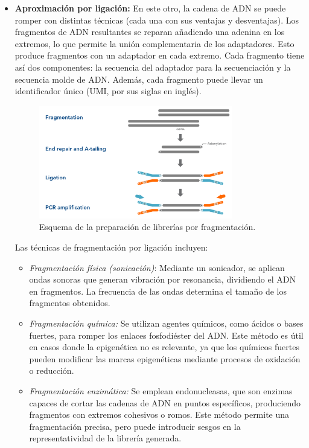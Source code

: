 \begin{itemize}
\item \textbf{Aproximación por ligación:} 
En este otro, la cadena de ADN se puede romper con distintas técnicas (cada una con sus ventajas y desventajas). Los fragmentos de ADN resultantes se reparan añadiendo una adenina en los extremos, lo que permite la unión complementaria de los adaptadores. Esto produce fragmentos con un adaptador en cada extremo. Cada fragmento tiene así dos componentes: la secuencia del adaptador para la secuenciación y la secuencia molde de ADN. Además, cada fragmento puede llevar un identificador único (UMI, por sus siglas en inglés). 

\begin{figure}[htbp]
\centering
\includegraphics[width = 0.8\textwidth]{figs/19_ng_lib-prep-frag.png}
\caption{Esquema de la preparación de librerías por fragmentación.}
\end{figure}

Las técnicas de fragmentación por ligación incluyen:
\begin{itemize}
\item \textit{Fragmentación física (sonicación)}:
Mediante un sonicador, se aplican ondas sonoras que generan vibración por resonancia, dividiendo el ADN en fragmentos. La frecuencia de las ondas determina el tamaño de los fragmentos obtenidos.
\item \textit{Fragmentación química:}
Se utilizan agentes químicos, como ácidos o bases fuertes, para romper los enlaces fosfodiéster del ADN. Este método es útil en casos donde la epigenética no es relevante, ya que los químicos fuertes pueden modificar las marcas epigenéticas mediante procesos de oxidación o reducción.
\item \textit{Fragmentación enzimática:}
Se emplean endonucleasas, que son enzimas capaces de cortar las cadenas de ADN en puntos específicos, produciendo fragmentos con extremos cohesivos o romos. Este método permite una fragmentación precisa, pero puede introducir sesgos en la representatividad de la librería generada.
\end{itemize}


\end{itemize}

